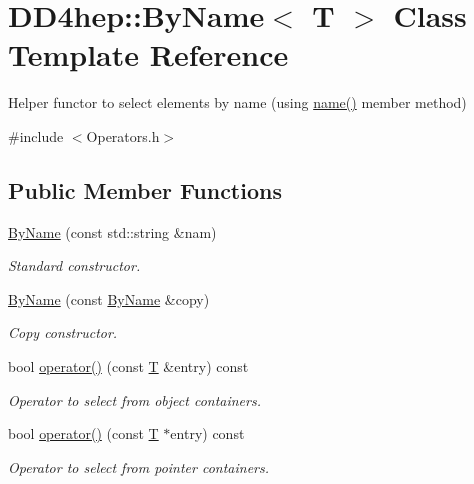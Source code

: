 \hypertarget{class_d_d4hep_1_1_by_name}{}\section{D\+D4hep\+:\+:By\+Name$<$ T $>$ Class Template Reference}
\label{class_d_d4hep_1_1_by_name}


Helper functor to select elements by name (using \hyperlink{class_d_d4hep_1_1_by_name_a06f4c668c9195f670ee1ace07191efa1}{name()} member method)  




{\ttfamily \#include $<$Operators.\+h$>$}

\subsection*{Public Member Functions}
\begin{DoxyCompactItemize}
\item 
\hyperlink{class_d_d4hep_1_1_by_name_af56a0a47ed14c746731c5b3d7e4eeadd}{By\+Name} (const std\+::string \&nam)
\begin{DoxyCompactList}\small\item\em Standard constructor. \end{DoxyCompactList}\item 
\hyperlink{class_d_d4hep_1_1_by_name_a09dee9528eddd3d93d3ab985717dc809}{By\+Name} (const \hyperlink{class_d_d4hep_1_1_by_name}{By\+Name} \&copy)
\begin{DoxyCompactList}\small\item\em Copy constructor. \end{DoxyCompactList}\item 
bool \hyperlink{class_d_d4hep_1_1_by_name_a31c19f8372a0ccacd0af0ee9c71e1a85}{operator()} (const \hyperlink{class_t}{T} \&entry) const
\begin{DoxyCompactList}\small\item\em Operator to select from object containers. \end{DoxyCompactList}\item 
bool \hyperlink{class_d_d4hep_1_1_by_name_a8973c4e23c796c168a01fb167368bc1c}{operator()} (const \hyperlink{class_t}{T} $\ast$entry) const
\begin{DoxyCompactList}\small\item\em Operator to select from pointer containers. \end{DoxyCompactList}\end{DoxyCompactItemize}
